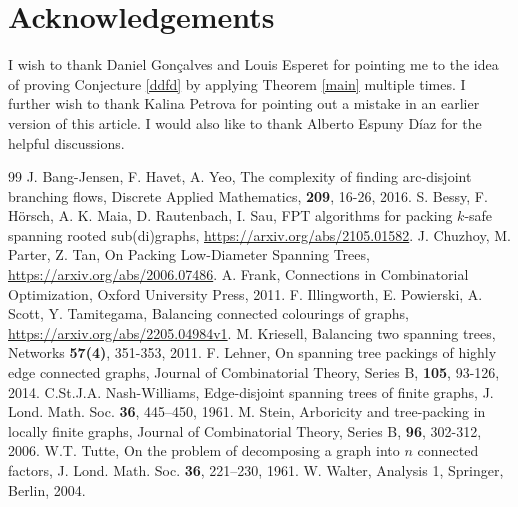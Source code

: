 \documentclass{article}
\theoremstyle{plain}
\theoremstyle{nonumberplain}
\theoremstyle{nonumberplain}
\begin{document}
\section*{Acknowledgements}
I wish to thank Daniel Gonçalves and Louis Esperet for pointing me to the idea of proving Conjecture \ref{ddfd} by applying Theorem \ref{main} multiple times. I further wish to thank Kalina Petrova for pointing out a mistake in an earlier version of this article. I would also like to thank Alberto Espuny D\'{i}az for the helpful discussions.
\begin{thebibliography}{99}
 J. Bang-Jensen, F. Havet, A. Yeo,  The complexity of finding arc-disjoint branching flows, Discrete Applied Mathematics, {\bf 209}, 16-26, 2016.
 S. Bessy, F. H\"orsch, A. K. Maia, D. Rautenbach, I. Sau,  FPT algorithms for packing $k$-safe spanning rooted sub(di)graphs, \url{https://arxiv.org/abs/2105.01582}.
J. Chuzhoy, M. Parter,  Z. Tan, On Packing Low-Diameter Spanning Trees, \url{https://arxiv.org/abs/2006.07486}.
 A. Frank, Connections in Combinatorial Optimization, Oxford University Press, 2011.
 F. Illingworth, E. Powierski, A. Scott,  Y. Tamitegama, Balancing connected colourings of graphs, \url{https://arxiv.org/abs/2205.04984v1}.
 M. Kriesell, Balancing two spanning trees, Networks {\bf 57(4)}, 351-353, 2011.
F. Lehner, On spanning tree packings of highly edge connected graphs, Journal of Combinatorial Theory, Series B, {\bf 105}, 93-126, 2014.
C.St.J.A. Nash-Williams, Edge-disjoint spanning trees of ﬁnite graphs, J. Lond. Math. Soc. {\bf 36}, 445–450, 1961.
M. Stein, Arboricity and tree-packing in locally finite graphs, Journal of Combinatorial Theory, Series B, {\bf 96}, 302-312, 2006.
W.T. Tutte, On the problem of decomposing a graph into $n$ connected factors, J. Lond. Math. Soc. {\bf 36}, 221–230, 1961.
 W. Walter, Analysis 1, Springer, Berlin, 2004.


\end{thebibliography}
\end{document}

